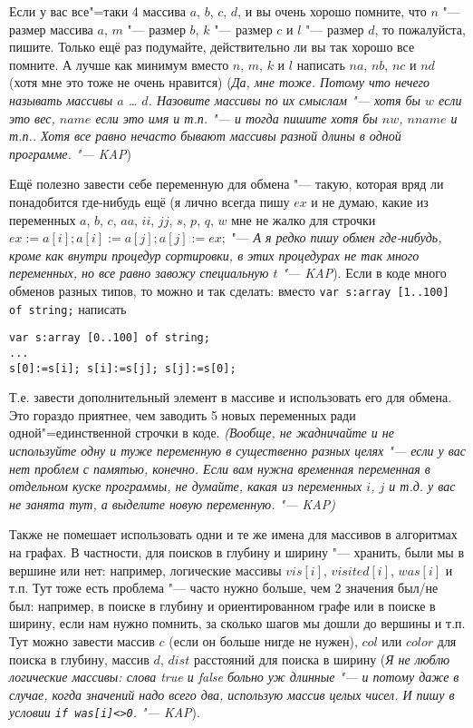 Если у вас все"=таки 4 массива $a$, $b$, $c$, $d$, 
и вы очень хорошо помните, что $n$ "--- размер массива $a$, $m$ "--- размер $b$, $k$ "--- размер 
$c$ и $l$ "--- размер $d$, то пожалуйста, пишите. Только ещё раз подумайте, действительно ли вы так 
хорошо все помните. А лучше как минимум вместо $n$, $m$, $k$ и $l$ написать $na$, $nb$, $nc$ и $nd$ (хотя мне 
это тоже не очень нравится) (\textsl{Да, мне тоже. Потому что нечего называть массивы $a$ \dots{} 
$d$. Назовите массивы по их смыслам "--- хотя бы $w$ если это вес, $name$ если это имя и т.п. "--- 
и тогда пишите хотя бы $nw$, $nname$ и т.п.. Хотя все равно нечасто бывают массивы разной длины в одной программе. "--- 
KAP})

  Ещё полезно завести себе переменную для обмена "--- такую, которая вряд ли понадобится где-нибудь ещё 
(я лично всегда пишу $ex$ и не думаю, какие из переменных $a$, $b$, $c$, $aa$, $ii$, $jj$, $s$, 
$p$, $q$, $w$ мне не жалко для строчки $ex:=a[i]; a[i]:=a[j]; a[j]:=ex;$ "--- \textsl{А я редко 
пишу обмен где-нибудь, кроме как внутри процедур сортировки, в этих процедурах не так много 
переменных, но все равно завожу специальную $t$ "--- KAP}).
Если в коде много обменов разных типов, то можно и так сделать: вместо \texttt{var s:array [1..100] 
of string;} написать
\begin{codesampleo}\begin{verbatim}
var s:array [0..100] of string;
...
s[0]:=s[i]; s[i]:=s[j]; s[j]:=s[0];
\end{verbatim}\end{codesampleo}
Т.е. завести дополнительный элемент в массиве и использовать его для обмена. Это гораздо приятнее, чем заводить 
5 новых переменных ради одной"=единственной строчки в коде. \textsl{(Вообще, не жадничайте и не используйте одну и туже переменную в существенно разных целях "--- если у вас нет проблем с памятью, конечно. Если вам нужна временная переменная в отдельном куске программы, не думайте, какая из переменных $i$, $j$ и т.д. у вас не занята тут, а выделите новую переменную. "--- KAP)}

Также не помешает использовать одни и те же имена для массивов в алгоритмах на графах. В частности, для поисков в глубину и 
ширину "--- хранить, были мы в вершине или нет: например, логические массивы $vis[i]$, 
$visited[i]$, $was[i]$ и т.п. Тут тоже есть проблема "--- часто нужно больше, чем 2 значения был/не 
был: например, в поиске в глубину и ориентированном графе или в поиске в ширину, если нам нужно 
помнить, за сколько шагов мы дошли до вершины и т.п. Тут можно завести массив $c$ (если он больше нигде не 
нужен), $col$ или $color$ для поиска в глубину, массив $d$, $dist$ расстояний для поиска в ширину 
(\textsl{Я не люблю логические массивы: слова true и false больно уж длинные "--- и потому даже в 
случае, когда значений надо всего два, использую массив целых чисел. И пишу в условии 
\texttt{if was[i]<>0}. "--- KAP}).

